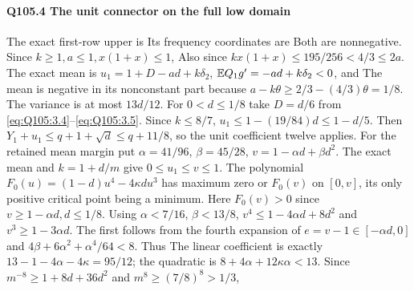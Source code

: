 \paragraph{Q105.4 The unit connector on the full low domain}\label{part:Q105.4}
The exact first-row upper is
Its frequency coordinates are
Both are nonnegative. Since $k\ge\allowbreak 1,\allowbreak a\le\allowbreak 1,\allowbreak x(1+x)\le\allowbreak 1$,
Also
since $kx(1+x)\le\allowbreak 195/256<\allowbreak 4/3\le\allowbreak 2a$.
The exact mean is $u_1=\allowbreak 1+D-ad+k\delta_2$,
$\mathbb E Q_1g'=\allowbreak -ad+k\delta_2<\allowbreak 0$, and
The mean is negative in its nonconstant part because
$a-k\theta\ge\allowbreak 2/3-(4/3)\theta=\allowbreak 1/8$.
The variance is at most $13d/12$.
For $0<\allowbreak d\le\allowbreak 1/8$ take $D=\allowbreak d/6$ from \eqref{eq:Q105:3.4}--\eqref{eq:Q105:3.5}.
Since $k\le\allowbreak 8/7$, $u_1\le\allowbreak 1-(19/84)d\le\allowbreak 1-d/5$.
Then $Y_1+u_1\le\allowbreak  q+1+\sqrt d\le\allowbreak  q+11/8$, so the unit coefficient twelve applies.
For the retained mean margin put
$\alpha=\allowbreak 41/96$, $\beta=\allowbreak 45/28$, $v=\allowbreak 1-\alpha d+\beta d^2$.
The exact mean and $k=\allowbreak 1+d/m$ give $0\le\allowbreak  u_1\le\allowbreak  v\le\allowbreak 1$.
The polynomial $F_0(u)=\allowbreak (1-d)u^4-4\kappa du^3$ has maximum zero or
$F_0(v)$ on $[0,\allowbreak v]$, its only positive critical point being a minimum.
Here $F_0(v)>\allowbreak 0$ since $v\ge\allowbreak 1-\alpha d,\allowbreak d\le\allowbreak 1/8$.
Using $\alpha<\allowbreak 7/16$, $\beta<\allowbreak 13/8$,
$v^4\le\allowbreak 1-4\alpha d+8d^2$ and $v^3\ge\allowbreak 1-3\alpha d$.
The first follows from the fourth expansion of
$e=\allowbreak v-1\in[-\alpha d,\allowbreak 0]$ and
$4\beta+6\alpha^2+\alpha^4/64<\allowbreak 8$.
Thus
The linear coefficient is exactly
$13-1-4\alpha-4\kappa=\allowbreak 95/12$; the quadratic is
$8+4\alpha+12\kappa\alpha<\allowbreak 13$.
Since $m^{-8}\ge\allowbreak 1+8d+36d^2$ and $m^8\ge\allowbreak (7/8)^8>\allowbreak 1/3$,
